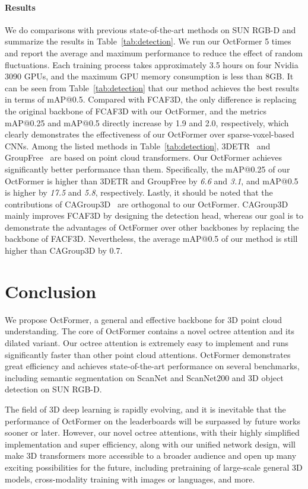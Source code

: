 \documentclass[acmtog,screen,authorversion]{acmart}
\begin{document}
\paragraph{Results}
We do comparisons with previous state-of-the-art methods on SUN RGB-D and summarize the results in Table~\ref{tab:detection}.
We run our OctFormer 5 times and report the average and maximum performance to reduce the effect of random fluctuations.
Each training process takes approximately 3.5 hours on four Nvidia 3090 GPUs, and the maximum GPU memory consumption is less than 8GB.
It can be seen from Table~\ref{tab:detection} that our method achieves the best results in terms of mAP@0.5.
Compared with FCAF3D, the only difference is replacing the original backbone of FCAF3D with our OctFormer, and the metrics mAP@0.25 and mAP@0.5 directly increase by 1.9 and 2.0, respectively, which clearly demonstrates the effectiveness of our OctFormer over sparse-voxel-based CNNs.
Among the listed methods in Table~\ref{tab:detection}, 3DETR~\cite{Misra2021} and GroupFree~\cite{Liu2021e} are based on point cloud transformers.
Our OctFormer achieves significantly better performance than them.
Specifically, the mAP@0.25 of our OctFormer is higher than 3DETR and GroupFree by \emph{6.6} and \emph{3.1}, and mAP@0.5 is higher by \emph{17.5} and \emph{5.8}, respectively.
Lastly, it should be noted that the contributions of CAGroup3D~\cite{Wang2022b} are orthogonal to our OctFormer.
CAGroup3D mainly improves FCAF3D by designing the detection head, whereas our goal is to demonstrate the advantages of OctFormer over other backbones by replacing the backbone of FACF3D.
Nevertheless, the average mAP@0.5 of our method is still higher than CAGroup3D by 0.7.
 \section{Conclusion} \label{sec:conclusion}

We propose OctFormer, a general and effective backbone for 3D point cloud understanding.
The core of OctFormer contains a novel octree attention and its dilated variant.
Our octree attention is extremely easy to implement and runs significantly faster than other point cloud attentions.
OctFormer demonstrates great efficiency and achieves state-of-the-art performance on several benchmarks, including semantic segmentation on ScanNet and ScanNet200 and 3D object detection on SUN RGB-D.

The field of 3D deep learning is rapidly evolving, and it is inevitable that the performance of OctFormer on the leaderboards will be surpassed by future works sooner or later.
However, our novel octree attentions, with their highly simplified implementation and super efficiency, along with our unified network design, will make 3D transformers more accessible to a broader audience and open up many exciting possibilities for the future, including pretraining of large-scale general 3D models, cross-modality training with images or languages, and more.
\end{document}
